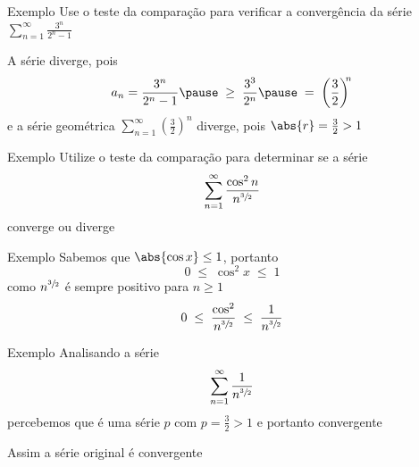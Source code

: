 \addtocounter{exemplo}{1}
\begin{frame}{Exemplo \theexemplo}
  Use o teste da comparação para verificar a convergência da série
  \(
    \sum_{n=1}^\infty\frac{3^n}{2^n-1}
  \)

  \pause
  \vspace{\baselineskip}
  A série diverge\pause,
  pois
  \[
    a_n = \frac{3^n}{2^n-1}
    \pause
    \;\geq\; \frac{3^3}{2^n}
    \pause
    \;=\;    \left(\frac{3}{2}\right)^{\!\!{n}}
  \]
  \pause
  e a série geométrica
  \(
    \sum_{n=1}^\infty\left(\frac{3}{2}\right)^{\!\!{n}}
  \)
  diverge\pause, pois \quad
  \(
    \abs{r}=\frac{3}{2}>1
  \)
\end{frame}

\addtocounter{exemplo}{1}
\begin{frame}{Exemplo \theexemplo}
  Utilize o teste da comparação para determinar se a série
  \[
    \sum_{n=1}^{\infty} \frac{\cos^2 n}{n^{\sfrac{3}{2}}}
  \]
  converge ou diverge
\end{frame}

\begin{frame}{Exemplo \theexemplo}
  Sabemos que \(\abs{\cos x}\leq 1\)\pause,
  portanto
  \[
    0 \;\leq\;\cos^2 x \;\leq\; 1
  \]
  \pause
  como $n^{\sfrac{3}{2}}$ é sempre positivo para $n\geq 1$
  \[
    0 \;\leq\; \frac{\cos^2}{n^{\sfrac{3}{2}}} \;\leq\; \frac{1}{n^{\sfrac{3}{2}}}
  \]
\end{frame}

\begin{frame}{Exemplo \theexemplo}
  Analisando a série
  \[
    \sum_{n=1}^{\infty} \frac{1}{n^{\sfrac{3}{2}}}
  \]
  percebemos que é uma série $p$ com $p=\frac{3}{2}>1$ e portanto convergente

  \pause
  \vspace{1.5\baselineskip}
  Assim a série original é convergente
\end{frame}

